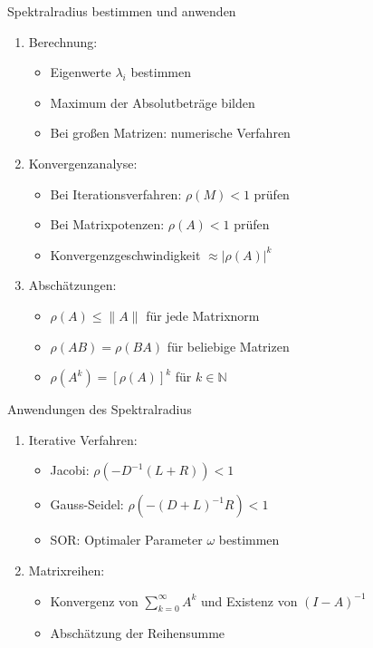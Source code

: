 \begin{KR}{Spektralradius bestimmen und anwenden}
\begin{enumerate}
    \item Berechnung:
    \begin{itemize}
        \item Eigenwerte $\lambda_i$ bestimmen
        \item Maximum der Absolutbeträge bilden
        \item Bei großen Matrizen: numerische Verfahren
    \end{itemize}
    
    \item Konvergenzanalyse:
    \begin{itemize}
        \item Bei Iterationsverfahren: $\rho(M) < 1$ prüfen
        \item Bei Matrixpotenzen: $\rho(A) < 1$ prüfen
        \item Konvergenzgeschwindigkeit $\approx |\rho(A)|^k$
    \end{itemize}
    
    \item Abschätzungen:
    \begin{itemize}
        \item $\rho(A) \leq \|A\|$ für jede Matrixnorm
        \item $\rho(AB) = \rho(BA)$ für beliebige Matrizen
        \item $\rho(A^k) = [\rho(A)]^k$ für $k \in \mathbb{N}$
    \end{itemize}
\end{enumerate}
\end{KR}

\begin{KR}{Anwendungen des Spektralradius}
\begin{enumerate}
    \item Iterative Verfahren:
    \begin{itemize}
        \item Jacobi: $\rho(-D^{-1}(L+R)) < 1$
        \item Gauss-Seidel: $\rho(-(D+L)^{-1}R) < 1$
        \item SOR: Optimaler Parameter $\omega$ bestimmen
    \end{itemize}
    
    \item Matrixreihen:
    \begin{itemize}
        \item Konvergenz von $\sum_{k=0}^\infty A^k$
        und Existenz von $(I-A)^{-1}$
        \item Abschätzung der Reihensumme
    \end{itemize}
\end{enumerate}
\end{KR}

